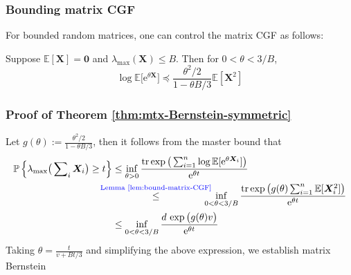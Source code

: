 \documentclass[compress,
mathserif,wide,%
]{beamer}
\begin{document}
\begin{frame}
\frametitle{Bounding matrix CGF}  


For bounded random matrices, one can control the matrix CGF as follows:

\bigskip
\bigskip

\begin{lemma}
	\label{lem:bound-matrix-CGF}
	Suppose $\mathbb{E}[\bm{X}]=\bm{0}$ and $\lambda_{\max}(\bm{X})\leq B$. Then for $0<\theta<3/B$,
	\vspace{-0.5em}
	\[
		\log\mathbb{E}\big[\mathrm{e}^{\theta\bm{X}}\big]\preceq\frac{\theta^{2}/2}{1-\theta B/3}\mathbb{E}[\bm{X}^{2}]
	\]
\end{lemma}



\end{frame}




\begin{frame}
\frametitle{Proof of Theorem \ref{thm:mtx-Bernstein-symmetric}}  


Let $g(\theta):=\frac{\theta^{2}/2}{1-\theta B/3}$, then it follows
from the master bound that
\begin{align*}
\mathbb{P}\left\{ \lambda_{\max}\big(\sum\nolimits _{i}\bm{X}_{i}\big)\geq t\right\}  & \leq\inf_{\theta>0}\frac{\mathrm{tr}\exp\big(\sum\nolimits _{i=1}^{n}\log\mathbb{E}[\mathrm{e}^{\theta\bm{X}_{i}}]\big)}{\mathrm{e}^{\theta t}}\\
	& \hspace{-1.5em}\overset{\alertb{\text{Lemma \ref{lem:bound-matrix-CGF}}}}{\leq}  \hspace{-1em} \inf_{0<\theta<3/B}\frac{\mathrm{tr}\exp\big(g(\theta)\sum\nolimits _{i=1}^{n}\mathbb{E}[\bm{X}_{i}^{2}]\big)}{\mathrm{e}^{\theta t}}\\
 & \leq \inf_{0<\theta<3/B}\frac{d\,\exp\big(g(\theta)v\big)}{\mathrm{e}^{\theta t}}
\end{align*}
Taking $\theta=\frac{t}{v+Bt/3}$ and simplifying the above expression, we establish matrix Bernstein

\end{frame}
\end{document}
